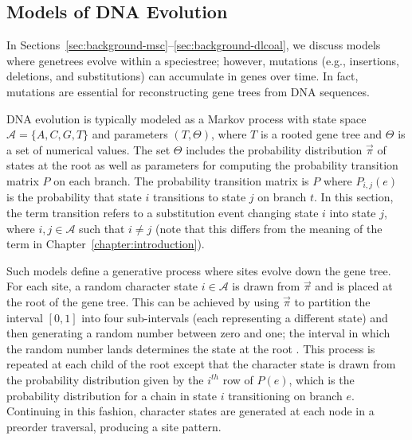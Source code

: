 \subsection{Models of DNA Evolution}
\label{sec:background-gtr}
In Sections~\ref{sec:background-msc}--\ref{sec:background-dlcoal}, we discuss models where \glspl{genetree} evolve within a \gls{speciestree}; however, mutations (e.g., insertions, deletions, and substitutions) can accumulate in \glspl{gene} over time.
In fact, mutations are essential for reconstructing gene trees from DNA sequences.

DNA evolution is typically modeled as a Markov process with state space $\mathcal{A} = \{A, C, G, T\}$ and parameters $(T, \Theta)$, where $T$ is a \gls{rooted} gene tree and $\Theta$ is a set of numerical values.
The set $\Theta$ includes the probability distribution $\vec{\pi}$ of states at the root as well as parameters for computing the probability transition matrix $P$ on each branch.
The probability transition matrix is $P$ where $P_{i,j}(e)$ is the probability that state $i$ transitions to state $j$ on branch $t$.
In this section, the term transition refers to a substitution event changing state $i$ into state $j$, where $i,j \in \mathcal{A}$ such that $i \ne j$ (note that this differs from the meaning of the term in Chapter~\ref{chapter:introduction}).

Such models define a generative process where sites evolve  down the gene tree. 
For each \gls{site}, a random character state $i \in \mathcal{A}$ is drawn from $\vec{\pi}$ and is placed at the root of the gene tree.
This can be achieved by using $\vec{\pi}$ to partition the interval $[0,1]$ into four sub-intervals (each representing a different state) and then generating a random number between zero and one; the interval in which the random number lands determines the state at the root \cite{rambaut1997seqgen}.
This process is repeated at each child of the root except that the character state is drawn from the probability distribution given by the $i^{th}$ row of $P(e)$, which is the probability distribution for a chain in state $i$ transitioning on branch $e$.
Continuing in this fashion, character states are generated at each node in a preorder traversal, producing a site pattern.

